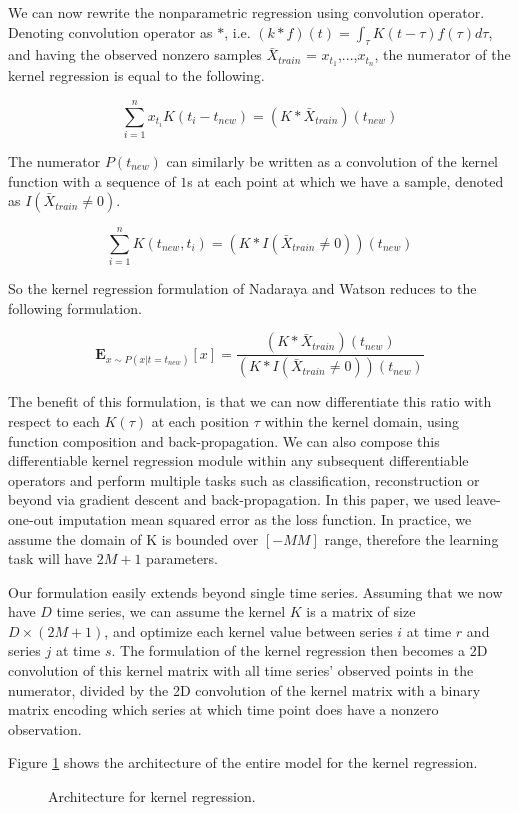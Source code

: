 \documentclass{article} %
\begin{document}
We can now rewrite the nonparametric regression using convolution operator. Denoting convolution operator as $\ast$, i.e. $(k \ast f)(t) = \int_\tau K(t-\tau) f(\tau) d\tau$, and having the observed nonzero samples $\bar X_{train}$ = {$x_{t_1}$,...,$x_{t_n}$}, the numerator of the kernel regression is equal to the following.

$$ \sum_{i=1}^n{x_{t_{i}}K(t_{i} - t_{new})} = (K \ast \bar X_{train}) (t_{new})$$

The numerator $P(t_{new})$ can similarly be written as a convolution of the kernel function with a sequence of $1$s at each point at which we have a sample, denoted as $I(\bar X_{train} \neq 0)$.

$$ \sum_{i=1}^n{K(t_{new}, t_{i})} = (K \ast I(\bar X_{train} \neq 0)) (t_{new}) $$

So the kernel regression formulation of Nadaraya and Watson reduces to the following formulation.

$$ \mathbf{E}_{x \sim P(x|t=t_{new})}[x] = \frac{(K \ast \bar X_{train}) (t_{new})}{(K \ast I(\bar X_{train} \neq 0)) (t_{new})} $$

The benefit of this formulation, is that we can now differentiate this ratio with respect to each $K(\tau)$ at each position $\tau$ within the kernel domain, using function composition and back-propagation\cite{}. We can also compose this differentiable kernel regression module within any subsequent differentiable operators and perform multiple tasks such as classification, reconstruction or beyond via gradient descent and back-propagation. In this paper, we used leave-one-out imputation mean squared error as the loss function. In practice, we assume the domain of K is bounded over $[-M M]$ range, therefore the learning task will have $2M+1$ parameters.

Our formulation easily extends beyond single time series. Assuming that we now have $D$ time series, we can assume the kernel $K$ is a matrix of size $D \times (2M+1)$, and optimize each kernel value between series $i$ at time $r$ and series $j$ at time $s$. The formulation of the kernel regression then becomes a 2D convolution of this kernel matrix with all time series' observed points in the numerator, divided by the 2D convolution of the kernel matrix with a binary matrix encoding which series at which time point does have a nonzero observation.

Figure \ref{fig:arch} shows the architecture of the entire model for the kernel regression.

\begin{figure}[h]
\begin{center}
\fbox{\rule[-.5cm]{0cm}{4cm} \rule[-.5cm]{4cm}{0cm}}
\end{center}
\caption{Architecture for kernel regression.}\label{fig:arch}
\end{figure}
\end{document}
